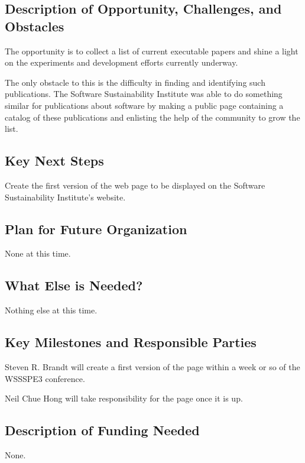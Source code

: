 \subsection{Description of Opportunity, Challenges, and Obstacles}

The opportunity is to collect a list of current executable papers and
shine a light on the experiments and development efforts currently underway.

The only obstacle to this is the difficulty in finding and identifying such
publications. The Software Sustainability Institute was able to do something similar
for publications about software by making a public page containing a catalog
of these publications and enlisting the help of the community to grow the list.

\subsection{Key Next Steps}

Create the first version of the web page to be displayed on the Software Sustainability
Institute's website.

\subsection{Plan for Future Organization}

None at this time.

\subsection{What Else is Needed?}

Nothing else at this time.

\subsection{Key Milestones and Responsible Parties}

Steven R. Brandt will create a first version of the page within a week or so of the WSSSPE3 conference.

Neil Chue Hong will take responsibility for the page once it is up.

\subsection{Description of Funding Needed}

None.
